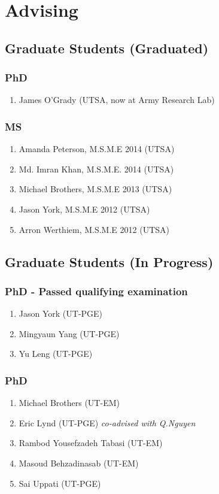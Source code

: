\section*{Advising}



\subsection*{Graduate Students (Graduated)}

\subsubsection*{PhD}
\begin{enumerate}
    \item James O'Grady (UTSA, now at Army Research Lab)
\end{enumerate}

\subsubsection*{MS}
\begin{enumerate}
    \item Amanda Peterson, M.S.M.E 2014 (UTSA)
    \item Md. Imran Khan, M.S.M.E. 2014 (UTSA)
    \item Michael Brothers, M.S.M.E 2013 (UTSA)
    \item Jason York, M.S.M.E 2012 (UTSA)
    \item Arron Werthiem, M.S.M.E 2012 (UTSA)
\end{enumerate}

\subsection*{Graduate Students (In Progress)}

\subsubsection*{PhD - Passed qualifying examination}
\begin{enumerate}
    \item Jason York (UT-PGE)
    \item Mingyaun Yang (UT-PGE)
    \item Yu Leng (UT-PGE)
\end{enumerate}

\subsubsection*{PhD}
\begin{enumerate}
    \item Michael Brothers (UT-EM)
    \item Eric Lynd (UT-PGE) \emph{co-advised with Q.Nguyen}
    \item Rambod Yousefzadeh Tabasi (UT-EM)
    \item Masoud Behzadinasab (UT-EM)
    \item Sai Uppati (UT-PGE)
\end{enumerate}

